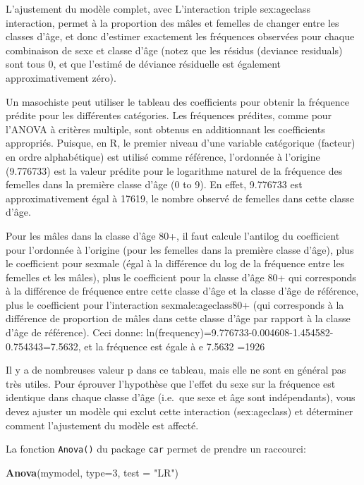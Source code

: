 \documentclass[12pt,]{book}
\newenvironment{Shaded}{\begin{snugshade}}{\end{snugshade}}
\newcommand{\DataTypeTok}[1]{\textcolor[rgb]{0.13,0.29,0.53}{#1}}
\newcommand{\DecValTok}[1]{\textcolor[rgb]{0.00,0.00,0.81}{#1}}
\newcommand{\KeywordTok}[1]{\textcolor[rgb]{0.13,0.29,0.53}{\textbf{#1}}}
\newcommand{\NormalTok}[1]{#1}
\newcommand{\StringTok}[1]{\textcolor[rgb]{0.31,0.60,0.02}{#1}}
\begin{document}
L'ajustement du modèle complet, avec L'interaction triple sex:ageclass interaction, permet à la proportion des mâles et femelles de changer entre les classes d'âge, et donc d'estimer exactement les fréquences observées pour chaque combinaison de sexe et classe d'âge (notez que les résidus (deviance residuals) sont tous 0, et que l'estimé de déviance résiduelle est également approximativement zéro).

Un masochiste peut utiliser le tableau des coefficients pour obtenir la fréquence prédite pour les différentes catégories. Les fréquences prédites, comme pour l'ANOVA à critères multiple, sont obtenus en additionnant les coefficients appropriés. Puisque, en R, le premier niveau d'une variable catégorique (facteur) en ordre alphabétique) est utilisé comme référence, l'ordonnée à l'origine (9.776733) est la valeur prédite pour le logarithme naturel de la fréquence des femelles dans la première classe d'âge (0 to 9). En effet, 9.776733 est approximativement égal à 17619, le nombre observé de femelles dans cette classe d'âge.

Pour les mâles dans la classe d'âge 80+, il faut calcule l'antilog du coefficient pour l'ordonnée à l'origine (pour les femelles dans la première classe d'âge), plus le coefficient pour sexmale (égal à la différence du log de la fréquence entre les femelles et les mâles), plus le coefficient pour la classe d'âge 80+ qui corresponds à la différence de fréquence entre cette classe d'âge et la classe d'âge de référence, plus le coefficient pour l'interaction sexmale:ageclass80+ (qui corresponds à la différence de proportion de mâles dans cette classe d'âge par rapport à la classe d'âge de référence). Ceci donne: ln(frequency)=9.776733-0.004608-1.454582-0.754343=7.5632, et la fréquence est égale à e 7.5632 =1926

Il y a de nombreuses valeur p dans ce tableau, mais elle ne sont en général pas très utiles. Pour éprouver l'hypothèse que l'effet du sexe sur la fréquence est identique dans chaque classe d'âge (i.e.~que sexe et âge sont indépendants), vous devez ajuster un modèle qui exclut cette interaction (sex:ageclass) et déterminer comment l'ajustement du modèle est affecté.

La fonction \texttt{Anova()} du package \texttt{car} permet de prendre un raccourci:

\begin{Shaded}
\begin{Highlighting}[]
\KeywordTok{Anova}\NormalTok{(mymodel, }\DataTypeTok{type=}\DecValTok{3}\NormalTok{, }\DataTypeTok{test =} \StringTok{"LR"}\NormalTok{)}
\end{Highlighting}
\end{Shaded}
\end{document}
